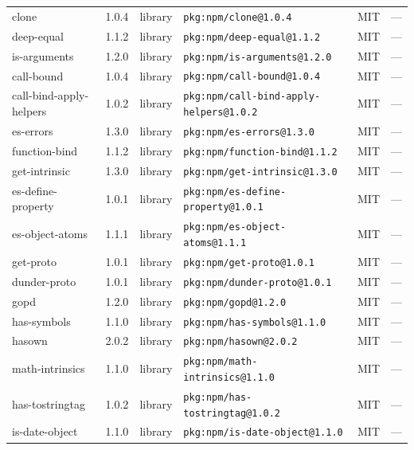 \documentclass[11pt,a4paper]{article}
\begin{document}
\begin{longtable}{|p{4cm}|p{2cm}|p{1.6cm}|p{5cm}|p{1.5cm}|p{3.5cm}|}
\raggedright clone & 1.0.4 & library & \small\texttt{pkg:npm/clone@1.0.4} & MIT & \small — \\
\raggedright deep-equal & 1.1.2 & library & \small\texttt{pkg:npm/deep-equal@1.1.2} & MIT & \small — \\
\raggedright is-arguments & 1.2.0 & library & \small\texttt{pkg:npm/is-arguments@1.2.0} & MIT & \small — \\
\raggedright call-bound & 1.0.4 & library & \small\texttt{pkg:npm/call-bound@1.0.4} & MIT & \small — \\
\raggedright call-bind-apply-helpers & 1.0.2 & library & \small\texttt{pkg:npm/call-bind-apply-helpers@1.0.2} & MIT & \small — \\
\raggedright es-errors & 1.3.0 & library & \small\texttt{pkg:npm/es-errors@1.3.0} & MIT & \small — \\
\raggedright function-bind & 1.1.2 & library & \small\texttt{pkg:npm/function-bind@1.1.2} & MIT & \small — \\
\raggedright get-intrinsic & 1.3.0 & library & \small\texttt{pkg:npm/get-intrinsic@1.3.0} & MIT & \small — \\
\raggedright es-define-property & 1.0.1 & library & \small\texttt{pkg:npm/es-define-property@1.0.1} & MIT & \small — \\
\raggedright es-object-atoms & 1.1.1 & library & \small\texttt{pkg:npm/es-object-atoms@1.1.1} & MIT & \small — \\
\raggedright get-proto & 1.0.1 & library & \small\texttt{pkg:npm/get-proto@1.0.1} & MIT & \small — \\
\raggedright dunder-proto & 1.0.1 & library & \small\texttt{pkg:npm/dunder-proto@1.0.1} & MIT & \small — \\
\raggedright gopd & 1.2.0 & library & \small\texttt{pkg:npm/gopd@1.2.0} & MIT & \small — \\
\raggedright has-symbols & 1.1.0 & library & \small\texttt{pkg:npm/has-symbols@1.1.0} & MIT & \small — \\
\raggedright hasown & 2.0.2 & library & \small\texttt{pkg:npm/hasown@2.0.2} & MIT & \small — \\
\raggedright math-intrinsics & 1.1.0 & library & \small\texttt{pkg:npm/math-intrinsics@1.1.0} & MIT & \small — \\
\raggedright has-tostringtag & 1.0.2 & library & \small\texttt{pkg:npm/has-tostringtag@1.0.2} & MIT & \small — \\
\raggedright is-date-object & 1.1.0 & library & \small\texttt{pkg:npm/is-date-object@1.1.0} & MIT & \small — \\

\end{longtable}
\end{document}

